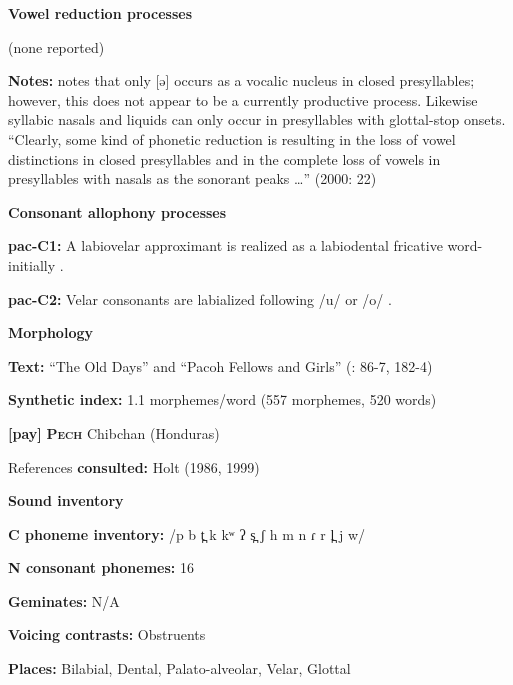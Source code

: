 \textbf{Vowel reduction processes}



(none reported)



\textbf{Notes:} \citet{Alves2000} notes that only [ə] occurs as a vocalic nucleus in closed presyllables; however, this does not appear to be a currently productive process. Likewise syllabic nasals and liquids can only occur in presyllables with glottal-stop onsets. “Clearly, some kind of phonetic reduction is resulting in the loss of vowel distinctions in closed presyllables and in the complete loss of vowels in presyllables with nasals as the sonorant peaks …” (2000: 22)



\textbf{Consonant allophony processes}



\textbf{pac-C1:} A labiovelar approximant is realized as a labiodental fricative word-initially \citep[11]{Alves2006}.



\textbf{pac-C2:} Velar consonants are labialized following /u/ or /o/ \citep[12]{Alves2006}.



\textbf{Morphology}



\textbf{Text:} “The Old Days” and “Pacoh Fellows and Girls” (\citealt{Watson1980}: 86-7, 182-4)



\textbf{Synthetic index:} 1.1 morphemes/word (557 morphemes, 520 words)



\textbf{[pay]}   \textbf{\textsc{Pech}}  Chibchan (Honduras)



References \textbf{consulted:} Holt (1986, 1999)



\textbf{Sound inventory}



\textbf{C phoneme inventory:} /p b t̪ k kʷ ʔ s̪ ʃ h m n ɾ r l̪ j w/



\textbf{N consonant phonemes:} 16



\textbf{Geminates:} N/A



\textbf{Voicing contrasts:} Obstruents



\textbf{Places:} Bilabial, Dental, Palato-alveolar, Velar, Glottal



